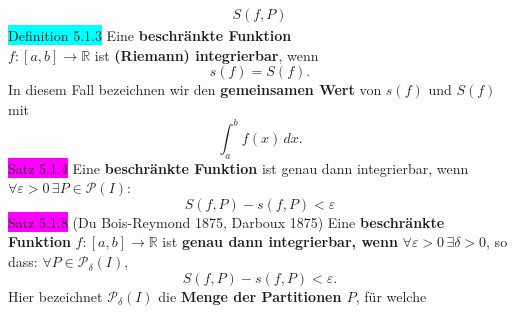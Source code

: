\documentclass[landscape, 10pt]{article}
\newcommand{\R}{\mathbb{R}}
\begin{document}
\begin{multicols}{3}
\begin{align*}
                            S(f,P)
                     \end{align*}
              \colorbox{cyan}{Definition 5.1.3} 
                     Eine \textbf{beschränkte Funktion} \\
                     \textcolor{NavyBlue}{
                     $f:[a,b]\longrightarrow\R$} 
                     ist \textbf{(Riemann) integrierbar}, 
                     wenn 
                     \begin{equation*}
                            s(f)=S(f).
                     \end{equation*}
                     In diesem Fall 
                     bezeichnen wir den \textbf{gemeinsamen Wert} 
                     von \textcolor{NavyBlue}{$s(f)$} und 
                     \textcolor{NavyBlue}{$S(f)$} mit 
                     \begin{equation*}
                            \int_a^bf(x)\,dx.
                     \end{equation*}
              \colorbox{magenta}{Satz 5.1.4} 
              Eine \textbf{beschränkte Funktion} ist 
                     genau dann integrierbar, wenn 
                     \textcolor{NavyBlue}{
                     $\forall\varepsilon>0\,
                     \exists P\in\mathcal{P}(I)$}:
                     \begin{equation*}
                            S(f,P)-s(f,P)<\varepsilon
                     \end{equation*}
              \vfill\null
              \columnbreak
              \colorbox{magenta}{Satz 5.1.8} 
              (Du Bois-Reymond 1875, Darboux 1875) 
                     Eine \textbf{beschränkte Funktion} 
                     \textcolor{NavyBlue}{
                     $f:[a,b]\longrightarrow\R$} 
                     ist \textbf{genau dann 
                     integrierbar, wenn} 
                     \textcolor{NavyBlue}{
                     $\forall\varepsilon>0\,
                     \exists\delta>0$}, 
                     so dass: \textcolor{NavyBlue}{
                     $\forall P\in\mathcal{P}_\delta(I)$},\,
                     \begin{equation*}
                            S(f,P)-s(f,P)<\varepsilon.   
                     \end{equation*}
                     Hier bezeichnet 
                     \textcolor{NavyBlue}{
                     $\mathcal{P}_\delta(I)$} die 
                     \textbf{Menge der Partitionen $P$}, 
                     für welche 

\end{multicols}
\end{document}
